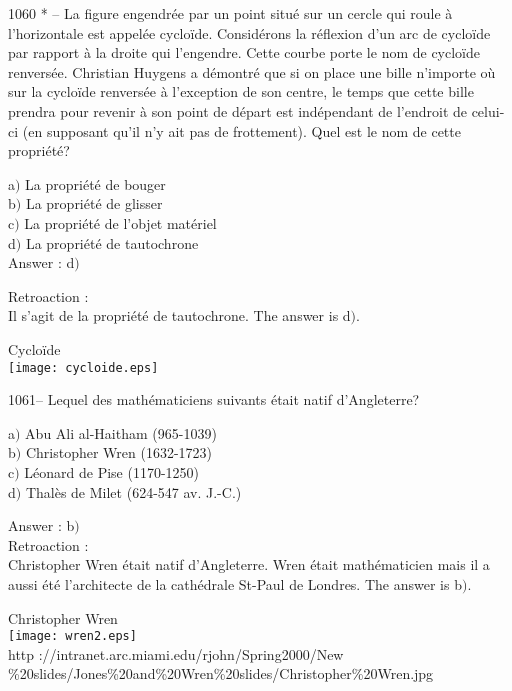 ﻿\documentclass[letterpaper, 12pt]{article}
\begin{document}
1060 * -- La figure engendr\'ee par un point situ\'e sur un cercle
qui roule \`a l'horizontale est appel\'ee cyclo\"ide. Consid\'erons
la r\'eflexion d'un arc de cyclo\"ide par rapport \`a la droite qui
l'engendre. Cette courbe porte le nom de cyclo\"ide renvers\'ee.
Christian Huygens a d\'emontr\'e que si on place une bille n'importe
o\`u sur la cyclo\"ide renvers\'ee \`a l'exception de son centre, le
temps que cette bille prendra pour revenir \`a son point de d\'epart
est ind\'ependant de l'endroit de celui-ci (en supposant qu'il n'y
ait pas de frottement). Quel est le nom de cette propri\'et\'e?

a$)$ La propri\'et\'e de bouger  \\
b$)$ La propri\'et\'e de glisser  \\
c$)$ La propri\'et\'e de l'objet mat\'eriel \\
d$)$ La propri\'et\'e de tautochrone \\

Answer : d$)$

Retroaction : \\
Il s'agit de la propri\'et\'e de tautochrone.
The answer is d$)$.\\

        \begin{center}

Cyclo\"ide        \\
    \texttt{[image: cycloide.eps]}\\
    \end{center}

1061-- Lequel des math\'ematiciens suivants \'etait natif
d'Angleterre?

a$)$ Abu Ali al-Haitham (965-1039) \\
b$)$ Christopher Wren (1632-1723) \\
c$)$ L\'eonard de Pise (1170-1250) \\
d$)$ Thal\`es de Milet (624-547 av. J.-C.)

Answer : b$)$\\

Retroaction : \\
Christopher Wren \'etait natif d'Angleterre. Wren \'etait
math\'ematicien mais il a aussi \'et\'e l'architecte de la
cath\'edrale St-Paul de Londres.
The answer is b$)$.\\

        \begin{center}
        Christopher Wren\\
    \texttt{[image: wren2.eps]}\\
        {\footnotesize http ://intranet.arc.miami.edu/rjohn/Spring2000/New\\
        \%20slides/Jones\%20and\%20Wren\%20slides/Christopher\%20Wren.jpg}
    \end{center}
\end{document}
